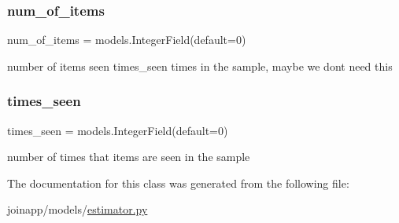 \mbox{\label{classjoinapp_1_1models_1_1estimator_1_1_f_statistic_a307badf59a3d70a334870ef2c1a7093d}} 
\subsubsection{\texorpdfstring{num\_of\_items}{num\_of\_items}}
{\footnotesize\ttfamily num\+\_\+of\+\_\+items = models.\+Integer\+Field(default=0)\hspace{0.3cm}{\ttfamily [static]}}



number of items seen times\+\_\+seen times in the sample, maybe we don\textquotesingle{}t need this 

\mbox{\label{classjoinapp_1_1models_1_1estimator_1_1_f_statistic_a39d472678e8c0e7dc09fe5ca5f952a85}} 
\subsubsection{\texorpdfstring{times\_seen}{times\_seen}}
{\footnotesize\ttfamily times\+\_\+seen = models.\+Integer\+Field(default=0)\hspace{0.3cm}{\ttfamily [static]}}



number of times that items are seen in the sample 



The documentation for this class was generated from the following file\+:\begin{DoxyCompactItemize}
\item 
joinapp/models/\mbox{\hyperlink{estimator_8py}{estimator.\+py}}\end{DoxyCompactItemize}
